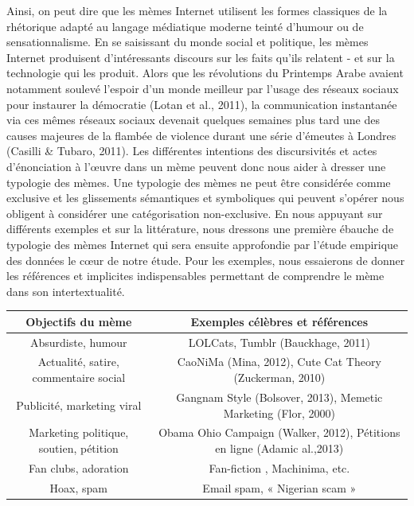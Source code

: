 {{Ainsi, on peut dire que les m\`emes Internet utilisent les formes
classiques de la rh\'etorique adapt\'e au langage m\'ediatique moderne
teint\'e d{\textquoteright}humour ou de sensationnalisme. En se
saisissant du monde social et politique, les m\`emes Internet
produisent d{\textquoteright}int\'eressants discours sur les faits
qu{\textquoteright}ils relatent - et sur la technologie qui les
produit. Alors que les r\'evolutions du Printemps Arabe avaient
notamment soulev\'e l{\textquoteright}espoir d{\textquoteright}un monde
meilleur par l{\textquoteright}usage des r\'eseaux sociaux pour
instaurer la d\'emocratie (Lotan et al., 2011), la communication
instantan\'ee via ces m\^emes r\'eseaux sociaux devenait quelques
semaines plus tard une des causes majeures de la flamb\'ee de violence
durant une s\'erie d{\textquoteright}\'emeutes \`a Londres (Casilli \&
Tubaro, 2011). Les diff\'erentes intentions des discursivit\'es et
actes d{\textquoteright}\'enonciation \`a l{\textquoteright}{\oe}uvre
dans un m\`eme peuvent donc nous aider \`a dresser une typologie des
m\`emes. Une typologie des m\`emes ne peut \^etre consid\'er\'ee comme
exclusive et les glissements s\'emantiques et symboliques qui peuvent
s{\textquoteright}op\'erer nous obligent \`a consid\'erer une
cat\'egorisation non-exclusive. En nous appuyant sur diff\'erents
exemples et sur la litt\'erature, nous dressons une premi\`ere
\'ebauche de typologie des m\`emes Internet qui sera ensuite
approfondie par l{\textquoteright}\'etude empirique des donn\'ees le
c{\oe}ur de notre \'etude. Pour les exemples, nous essaierons de donner
les r\'ef\'erences et implicites indispensables permettant de
comprendre le m\`eme dans son intertextualit\'e.

\begin{tabular}{c|c}
Objectifs du mème  & Exemples célèbres et références \\
\hline
Absurdiste, humour &  LOLCats, Tumblr (Bauckhage, 2011) \\
\hline
Actualité, satire, commentaire social  & CaoNiMa (Mina, 2012), Cute Cat Theory (Zuckerman, 2010) \\
\hline
Publicité, marketing viral & Gangnam Style (Bolsover, 2013), Memetic Marketing (Flor, 2000) \\
\hline
Marketing politique, soutien, pétition & Obama Ohio Campaign (Walker, 2012), Pétitions en ligne (Adamic al.,2013) \\
\hline
Fan clubs, adoration  &  Fan-fiction , Machinima, etc. \\
\hline
Hoax, spam & Email spam, « Nigerian scam » \\
\hline
\end{tabular}


}}
